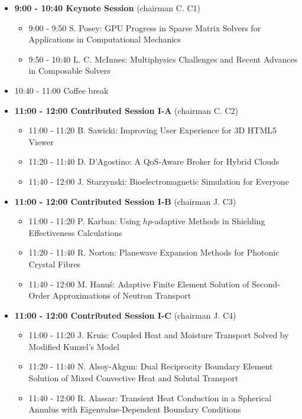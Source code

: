 \documentclass[10pt, A4]{article}%
\begin{document}
\begin{itemize}    
  \item {\bf 9:00 - 10:40 Keynote Session} (chairman C. C1) 
  \begin{itemize}
    \item 9:00 - 9:50 S. Posey: GPU Progress in Sparse Matrix Solvers for Applications in Computational Mechanics
    \item 9:50 - 10:40 L. C. McInnes: Multiphysics Challenges and Recent Advances in Composable Solvers
  \end{itemize}
  \item 10:40 - 11:00 Coffee break
  \item {\bf 11:00 - 12:00 Contributed Session I-A} (chairman C. C2) 
  \begin{itemize}
    \item 11:00 - 11:20 B. Sawicki: Improving User Experience for 3D HTML5 Viewer
    \item 11:20 - 11:40 D. D’Agostino: A QoS-Aware Broker for Hybrid Clouds
    \item 11:40 - 12:00 J. Starzynski: Bioelectromagnetic Simulation for Everyone 
  \end{itemize}
  \item {\bf 11:00 - 12:00 Contributed Session I-B} (chairman J. C3) 
  \begin{itemize}
    \item 11:00 - 11:20 P. Karban: Using $hp$-adaptive Methods in Shielding Effectiveness Calculations 
    \item 11:20 - 11:40 R. Norton: Planewave Expansion Methods for Photonic Crystal Fibres
    \item 11:40 - 12:00 M. Hanu\v{s}: Adaptive Finite Element Solution of Second-Order Approximations of Neutron Transport
  \end{itemize}
  \item {\bf 11:00 - 12:00 Contributed Session I-C} (chairman J. C4) 
  \begin{itemize}
    \item 11:00 - 11:20 J. Kruis: Coupled Heat and Moisture Transport Solved by Modified Kunzel’s Model  
    \item 11:20 - 11:40 N. Alsoy-Akgun: Dual Reciprocity Boundary Element Solution of Mixed Convective Heat and Solutal Transport 
    \item 11:40 - 12:00 R. Alassar: Transient Heat Conduction in a Spherical Annulus with Eigenvalue-Dependent Boundary Conditions
  \end{itemize}

\end{itemize}
\end{document}
